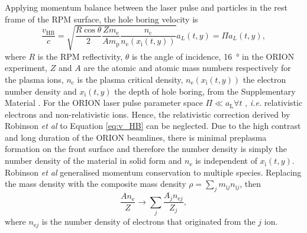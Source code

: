 Applying momentum balance between the laser pulse and particles in the rest frame of the \ac{RPM} surface, the hole boring velocity is
\begin{equation}\label{eq:v_HB}
	\frac{v_\mathrm{HB}}{c} = \sqrt{\frac{R\cos\theta}{2}\frac{Zm_\mathrm{e}}{Am_\mathrm{p}}\frac{n_\mathrm{c}}{n_\mathrm{e}(x_\mathrm{i}(t,y))}}a_L(t,y) = \Pi a_L(t,y),
\end{equation}
where $R$ is the RPM reflectivity, $\theta$ is the angle of incidence, \qty{16}{\degree} in the ORION experiment, $Z$ and $A$ are the atomic and atomic mass numbers respectively for the plasma ions, $n_\mathrm{c}$ is the plasma critical density, $n_\mathrm{e}(x_\mathrm{i}(t,y))$ the electron number density and $x_\mathrm{i}(t,y)$
the depth of hole boring, from the Supplementary Material \cite{vincentiOpticalPropertiesRelativistic2014}. For the ORION laser pulse parameter space $\Pi \ll a_\mathrm{L}\forall t$ , \textit{i.e.} relativistic electrons and non-relativistic ions. Hence, the relativistic correction derived by Robinson \textit{et al} \cite{robinsonRelativisticallyCorrectHoleboring2009} to Equation \ref{eq:v_HB} can be neglected. Due to the high contrast and long duration of the ORION beamlines, there is minimal preplasma formation on the front surface and therefore the number density is simply the number density of the material in solid form and $n_\mathrm{e}$ is independent of $x_\mathrm{i}(t,y)$. Robinson \textit{et al} \cite{robinsonHoleboringRadiationPressure2009} generalised momentum conservation to multiple species. Replacing the mass density with the composite mass density $\rho = \sum_j m_{\mathrm{i}j}n_{\mathrm{i}j}$, then
\begin{equation}
	\frac{An_\mathrm{e}}{Z} \to \sum_j \frac{A_jn_{\mathrm{e}j}}{Z_j},
\end{equation}
where $n_{\mathrm{e}j}$ is the number density of electrons that originated from the $j$ ion.


